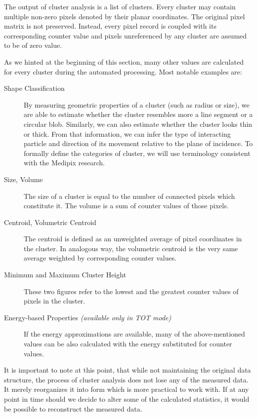 
The output of cluster analysis is a list of clusters. Every cluster may contain multiple non-zero pixels denoted by their planar coordinates. The original pixel matrix is not preserved. Instead, every pixel record is coupled with its corresponding counter value and pixels unreferenced by any cluster are assumed to be of zero value.

As we hinted at the beginning of this section, many other values are calculated for every cluster during the automated processing. Most notable examples are:

\begin{description}
	\item[Shape Classification]
	By measuring geometric properties of a cluster (such as radius or size), we are able to estimate whether the cluster resembles more a line segment or a circular blob. Similarly, we can also estimate whether the cluster looks thin or thick. From that information, we can infer the type of interacting particle and direction of its movement relative to the plane of incidence. To formally define the categories of cluster, we will use terminology consistent with the Medipix research.


	\item[Size, Volume]
	The size of a cluster is equal to the number of connected pixels which constitute it. The volume is a sum of counter values of those pixels.

	\item[Centroid, Volumetric Centroid]
	The centroid is defined as an unweighted average of pixel coordinates in the cluster. In analogous way, the volumetric centroid is the very same average weighted by corresponding counter values. 

	\item[Minimum and Maximum Cluster Height]
	These two figures refer to the lowest and the greatest counter values of pixels in the cluster.

	\item[Energy-based Properties \textit{(available only in TOT mode)}]
	If the energy approximations are available, many of the above-mentioned values can be also calculated with the energy substituted for counter values.
\end{description}

It is important to note at this point, that while not maintaining the original data structure, the process of cluster analysis does not lose any of the measured data. It merely reorganizes it into form which is more practical to work with. If at any point in time should we decide to alter some of the calculated statistics, it would be possible to reconstruct the measured data.


